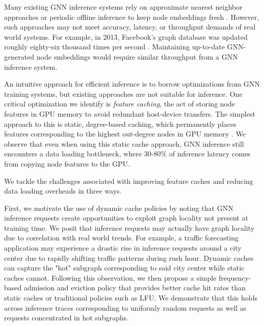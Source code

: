Many existing GNN inference systems rely on approximate nearest neighbor approaches or periodic offline inference to keep node embeddings fresh \cite{Recsys_PinSAGE_2018} \cite{Recsys_Survey_2022}. However, such approaches may not meet accuracy, latency, or throughput demands of real world systems. For example, in 2013, Facebook's graph database was updated roughly eighty-six thousand times per second \cite{Graph_Survey_2020}. Maintaining up-to-date GNN-generated node embeddings would require similar throughput from a GNN inference system.

An intuitive approach for efficient inference is to borrow optimizations from GNN training systems, but existing approaches are not suitable for inference. One critical optimization we identify is \textit{feature caching}, the act of storing node features in GPU memory to avoid redundant host-device transfers.
The simplest approach to this is static, degree-based caching, which permanently places features corresponding to the highest out-degree nodes in GPU memory \cite{PaGraph_2020}.
We observe that even when using this static cache approach, GNN inference still encounters a data loading bottleneck, where 30-80\% of inference latency comes from copying node features to the GPU.

We tackle the challenges associated with improving feature caches and reducing data loading overheads in three ways.

First, we motivate the use of dynamic cache policies by noting that GNN inference requests create opportunities to exploit graph locality not present at training time. We posit that inference requests may actually have graph locality due to correlation with real world trends. For example, a traffic forecasting application may experience a drastic rise in inference requests around a city center due to rapidly shifting traffic patterns during rush hour. Dynamic caches can capture the "hot" subgraph corresponding to said city center while static caches cannot. Following this observation, we then propose a simple frequency-based admission and eviction policy that provides better cache hit rates than static caches or traditional policies such as LFU. We demonstrate that this holds across inference traces corresponding to uniformly random requests as well as requests concentrated in hot subgraphs.


